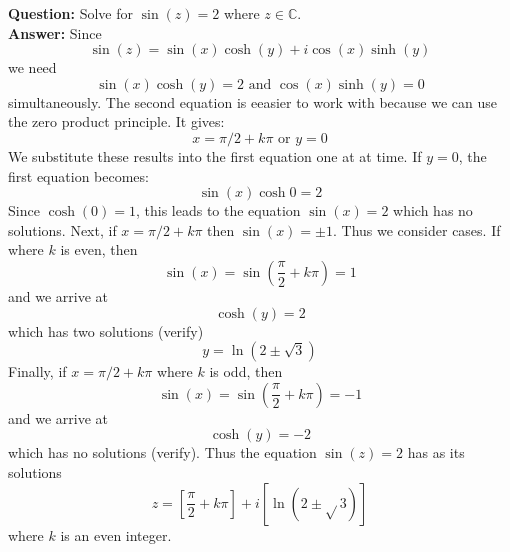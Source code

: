 \begin{example}
\textbf{Question:} Solve for $\sin (z)=2$ where $z\in\mathbb C$.\\
\textbf{Answer:} Since
$$
\sin (z)=\sin (x) \cosh (y)+i \cos (x) \sinh (y)
$$
we need
$$
\sin (x) \cosh (y)=2 \text { and } \cos (x) \sinh (y)=0
$$
simultaneously. The second equation is eeasier to work with because we can use the zero product principle. It gives:
$$
x=\pi / 2+k \pi \text { or } y=0
$$
We substitute these results into the first equation one at at time. If $y=0$, the first equation becomes:
$$
\sin (x) \cosh 0=2
$$
Since $\cosh (0)=1$, this leads to the equation $\sin (x)=2$ which has no solutions.
Next, if $x=\pi / 2+k \pi$ then $\sin (x)= \pm 1$. Thus we consider cases. If where $k$ is even, then
$$
\sin (x)=\sin \left(\frac{\pi}{2}+k \pi\right)=1
$$
and we arrive at
$$
\cosh (y)=2
$$
which has two solutions (verify)
$$
y=\ln (2 \pm \sqrt{3})
$$
Finally, if $x=\pi / 2+k \pi$ where $k$ is odd, then
$$
\sin (x)=\sin \left(\frac{\pi}{2}+k \pi\right)=-1
$$
and we arrive at
$$
\cosh (y)=-2
$$
which has no solutions (verify). Thus the equation $\sin (z)=2$ has as its solutions
$$
z=\left[\frac{\pi}{2}+k \pi\right]+i[\ln (2 \pm \sqrt{ } 3)]
$$
where $k$ is an even integer.
\end{example}

